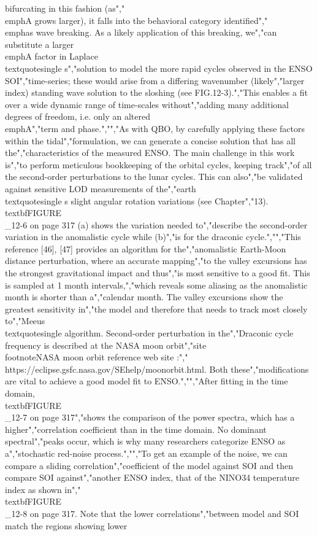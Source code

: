 {{{{{{{{{{bifurcating in this fashion (as","\\emph{A} grows larger), it falls into the behavioral category identified","\\emph{as wave breaking}. As a likely application of this breaking, we","can substitute a larger \\emph{A} factor in Laplace\\textquotesingle s","solution to model the more rapid cycles observed in the ENSO SOI","time-series; these would arise from a differing wavenumber (likely","larger index) standing wave solution to the sloshing (see FIG.12-3).","This enables a fit over a wide dynamic range of time-scales without","adding many additional degrees of freedom, i.e. only an altered \\emph{A}","term and phase.","","As with QBO, by carefully applying these factors within the tidal","formulation, we can generate a concise solution that has all the","characteristics of the measured ENSO. The main challenge in this work is","to perform meticulous bookkeeping of the orbital cycles, keeping track","of all the second-order perturbations to the lunar cycles. This can also","be validated against sensitive LOD measurements of the","earth\\textquotesingle s slight angular rotation variations (see Chapter","13). \\textbf{FIGURE\\_12-6 on page 317} (a) shows the variation needed to","describe the second-order variation in the anomalistic cycle while (b)","is for the draconic cycle.","","This reference {[}46{]}, {[}47{]} provides an algorithm for the","anomalistic Earth-Moon distance perturbation, where an accurate mapping","to the valley excursions has the strongest gravitational impact and thus","is most sensitive to a good fit. This is sampled at 1 month intervals,","which reveals some aliasing as the anomalistic month is shorter than a","calendar month. The valley excursions show the greatest sensitivity in","the model and therefore that needs to track most closely to","Meeus\\textquotesingle{} algorithm. Second-order perturbation in the","Draconic cycle frequency is described at the NASA moon orbit","site\\footnote{NASA moon orbit reference web site :","  https://eclipse.gsfc.nasa.gov/SEhelp/moonorbit.html}. Both these","modifications are vital to achieve a good model fit to ENSO.","","After fitting in the time domain, \\textbf{FIGURE\\_12-7 on page 317}","shows the comparison of the power spectra, which has a higher","correlation coefficient than in the time domain. No dominant spectral","peaks occur, which is why many researchers categorize ENSO as a","stochastic red-noise process.","","To get an example of the noise, we can compare a sliding correlation","coefficient of the model against SOI and then compare SOI against","another ENSO index, that of the NINO34 temperature index as shown in","\\textbf{FIGURE\\_12-8 on page 317}. Note that the lower correlations","between model and SOI match the regions showing lower }}}}}}}}}}
